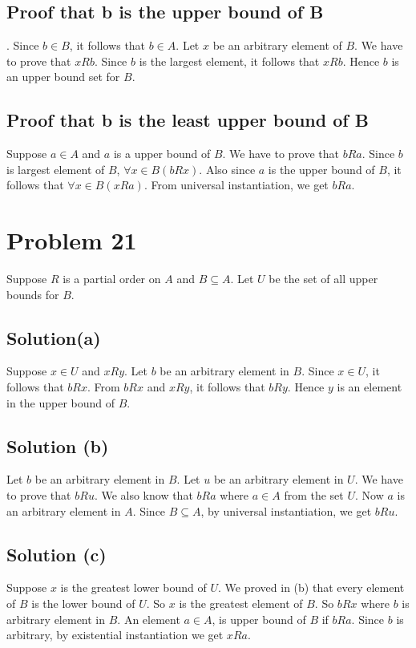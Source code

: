 \documentclass{article}
\begin{document}
\subsection{Proof that b is the upper bound of B}.
Since $b \in B$, it follows that $b \in A$. Let $x$ be an arbitrary
element of $B$. We have to prove that $xRb$. Since $b$ is the largest
element, it follows that $xRb$. Hence $b$ is an upper bound set for
$B$.

\subsection{Proof that b is the least upper bound of B}
Suppose $a \in A$ and $a$ is a upper bound of $B$. We have to prove
that $bRa$. Since $b$ is largest element of $B$, $\forall x \in
B(bRx)$. Also since $a$ is the upper bound of $B$, it follows that
$\forall x \in B(xRa)$. From universal instantiation, we get $bRa$.

\section{Problem 21}
Suppose $R$ is a partial order on $A$ and $B \subseteq A$. Let $U$ be
the set of all upper bounds for $B$.
\subsection{Solution(a)}
Suppose $x \in U$ and $xRy$. Let $b$ be an arbitrary element in $B$.
Since $x \in U$, it follows that $bRx$. From $bRx$ and $xRy$, it
follows that $bRy$. Hence $y$ is an element in the upper bound of $B$.
\subsection{Solution (b)}
Let $b$ be an arbitrary element in $B$. Let $u$ be an arbitrary
element in $U$. We have to prove that $bRu$. We also know that $bRa$
where $a \in A$ from the set $U$. Now $a$ is an arbitrary element in
$A$. Since $B \subseteq A$, by universal instantiation, we get $bRu$.
\subsection{Solution (c)}
Suppose $x$ is the greatest lower bound of $U$. We proved in (b) that
every element of $B$ is the lower bound of $U$. So $x$ is the greatest
element of $B$. So $bRx$ where $b$ is arbitrary element in $B$. An
element $a \in A$, is upper bound of $B$ if $bRa$. Since $b$ is
arbitrary, by existential instantiation we get $xRa$.
\end{document}
